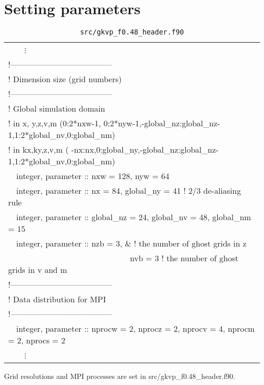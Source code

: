 \section{Setting parameters}
\label{sec:Setting parameters}
\begin{table}[tb!]
  \caption{\texttt{src/gkvp\_f0.48\_header.f90}}
  \centering
  \begin{tabular}{| l |}
  \hline
  ~~~~$\vdots$ \\
  !--------------------------------------\\
  ! Dimension size (grid numbers)\\
  !--------------------------------------\\
  ! Global simulation domain\\
  ! in x, y,z,v,m (0:2*nxw-1, 0:2*nyw-1,-global\_nz:global\_nz-1,1:2*global\_nv,0:global\_nm)\\
  ! in kx,ky,z,v,m ( -nx:nx,0:global\_ny,-global\_nz:global\_nz-1,1:2*global\_nv,0:global\_nm)\\
  ~~integer, parameter :: nxw = 128, nyw = 64\\
  ~~integer, parameter :: nx = 84, global\_ny = 41 ! 2/3 de-aliasing rule\\
  ~~integer, parameter :: global\_nz = 24, global\_nv = 48, global\_nm = 15\\
  ~~integer, parameter :: nzb = 3, \& ! the number of ghost grids in z\\
  ~~~~~~~~~~~~~~~~~~~~~~~~~~~~~~nvb = 3 ! the number of ghost grids in v and m\\
  !--------------------------------------\\
  ! Data distribution for MPI\\
  !--------------------------------------\\
  ~~integer, parameter :: nprocw = 2, nprocz = 2, nprocv = 4, nprocm = 2, nprocs = 2\\
  ~~~~$\vdots$ \\
  \hline
  \end{tabular}
\end{table}
Grid resolutions and MPI processes are set in src/gkvp\_f0.48\_header.f90.

